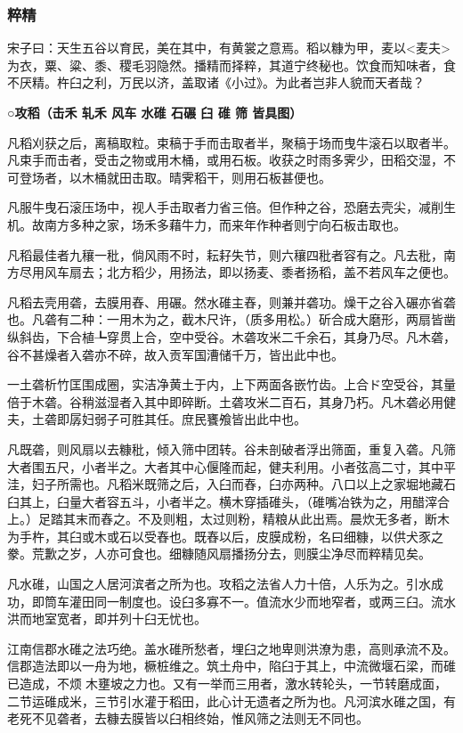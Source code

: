 \documentclass[]{article}
\begin{document}
\hypertarget{header-n2366}{%
\subsubsection{粹精}\label{header-n2366}}

宋子曰：天生五谷以育民，美在其中，有黄裳之意焉。稻以糠为甲，麦以\textless{}麦夫\textgreater{}为衣，粟、粱、黍、稷毛羽隐然。播精而择粹，其道宁终秘也。饮食而知味者，食不厌精。杵臼之利，万民以济，盖取诸《小过》。为此者岂非人貌而天者哉？

\textbf{○攻稻（击禾 轧禾 风车 水碓 石碾 臼 碓 筛 皆具图）}

凡稻刈获之后，离稿取粒。束稿于手而击取者半，聚稿于场而曳牛滚石以取者半。凡束手而击者，受击之物或用木桶，或用石板。收获之时雨多霁少，田稻交湿，不可登场者，以木桶就田击取。晴霁稻干，则用石板甚便也。

凡服牛曳石滚压场中，视人手击取者力省三倍。但作种之谷，恐磨去壳尖，减削生机。故南方多种之家，场禾多藉牛力，而来年作种者则宁向石板击取也。

凡稻最佳者九穰一秕，倘风雨不时，耘耔失节，则六穰四秕者容有之。凡去秕，南方尽用风车扇去；北方稻少，用扬法，即以扬麦、黍者扬稻，盖不若风车之便也。

凡稻去壳用砻，去膜用舂、用碾。然水碓主舂，则兼并砻功。燥干之谷入碾亦省砻也。凡砻有二种：一用木为之，截木尺许，（质多用松。）斫合成大磨形，两扇皆凿纵斜齿，下合植┺穿贯上合，空中受谷。木砻攻米二千余石，其身乃尽。凡木砻，谷不甚燥者入砻亦不碎，故入贡军国漕储千万，皆出此中也。

一土砻析竹匡围成圈，实洁净黄土于内，上下两面各嵌竹齿。上合ド空受谷，其量倍于木砻。谷稍滋湿者入其中即碎断。土砻攻米二百石，其身乃朽。凡木砻必用健夫，土砻即孱妇弱子可胜其任。庶民饔飧皆出此中也。

凡既砻，则风扇以去糠秕，倾入筛中团转。谷未剖破者浮出筛面，重复入砻。凡筛大者围五尺，小者半之。大者其中心偃隆而起，健夫利用。小者弦高二寸，其中平洼，妇子所需也。凡稻米既筛之后，入臼而舂，臼亦两种。八口以上之家堀地藏石臼其上，臼量大者容五斗，小者半之。横木穿插碓头，（碓嘴冶铁为之，用醋滓合上。）足踏其末而舂之。不及则粗，太过则粉，精粮从此出焉。晨炊无多者，断木为手杵，其臼或木或石以受舂也。既舂以后，皮膜成粉，名曰细糠，以供犬豕之豢。荒歉之岁，人亦可食也。细糠随风扇播扬分去，则膜尘净尽而粹精见矣。

凡水碓，山国之人居河滨者之所为也。攻稻之法省人力十倍，人乐为之。引水成功，即筒车灌田同一制度也。设臼多寡不一。值流水少而地窄者，或两三臼。流水洪而地室宽者，即并列十臼无忧也。

江南信郡水碓之法巧绝。盖水碓所愁者，埋臼之地卑则洪潦为患，高则承流不及。信郡造法即以一舟为地，橛桩维之。筑土舟中，陷臼于其上，中流微堰石梁，而碓已造成，不烦木壅坡之力也。又有一举而三用者，激水转轮头，一节转磨成面，二节运碓成米，三节引水灌于稻田，此心计无遗者之所为也。凡河滨水碓之国，有老死不见砻者，去糠去膜皆以臼相终始，惟风筛之法则无不同也。
\end{document}
